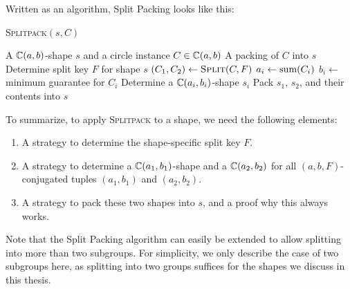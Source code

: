 \documentclass[a4paper,style=print,bibliography=totoc,nexus,lnum,extramargin]{tubsbook}
\begin{document}

Written as an algorithm, Split Packing looks like this:

\begin{algorithm}
    \caption{\textsc{Splitpack}$(s,C)$}
    \begin{algorithmic}
        \Require A $\mathbb{C}(a,b)$-shape $s$ and a circle instance $C \in \mathbb{C}(a,b)$
        \Ensure A packing of $C$ into $s$
        \State Determine split key $F$ for shape $s$
        \State $(C_1, C_2) \gets \textsc{Split}(C,F)$ 
            \State $a_i \gets \operatorname{sum}(C_i)$
            \State $b_i \gets$ minimum guarantee for $C_i$ 
            \State Determine a $\mathbb{C}(a_i, b_i)$-shape $s_i$
            \State {}
        \EndFor
        \State Pack $s_1$, $s_2$, and their contents into $s$
    \end{algorithmic}
\end{algorithm}

To summarize, to apply \textsc{Splitpack} to a shape, we need the following elements:

\begin{enumerate}
    \item A strategy to determine the shape-specific split key $F$.
    \item A strategy to determine a $\mathbb{C}(a_1, b_1)$-shape and a $\mathbb{C}(a_2, b_2)$ for all $(a,b,F)$-conjugated tuples $(a_1, b_1)$ and $(a_2, b_2)$.
    \item A strategy to pack these two shapes into $s$, and a proof why this always works.
\end{enumerate}

Note that the Split Packing algorithm can easily be extended to allow splitting into more than two subgroups. For simplicity, we only describe the case of two subgroups here, as splitting into two groups suffices for the shapes we discuss in this thesis.


\end{document}
